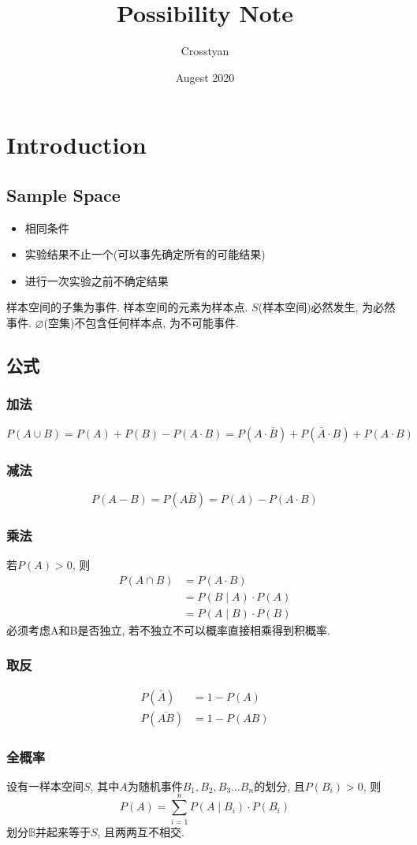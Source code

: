\documentclass[a4paper]{report}
\title{Possibility Note}
\author{Crosstyan}
\date{Augest 2020}
\begin{document}
\chapter{Introduction}
\section{Sample Space}
\begin{itemize}
  \item 相同条件
  \item 实验结果不止一个(可以事先确定所有的可能结果)
  \item 进行一次实验之前不确定结果
\end{itemize}
样本空间的子集为事件. 样本空间的元素为样本点. $S$(样本空间)必然发生, 为必然事件. $\varnothing$(空集)不包含任何样本点, 为不可能事件. 
\section{公式}
\subsection{加法}
$$P(A\cup B)=P(A)+P(B)-P(A\cdot B)=P(A\cdot\bar{B})+P(\bar{A}\cdot B)+P(A\cdot B)$$
\subsection{减法}
$$P(A-B)=P(A\bar{B})=P(A)-P(A\cdot B)$$
\subsection{乘法}
若$P(A) > 0$, 则
\begin{align*}
  P(A\cap B)&=P(A\cdot B)\\
  &=P(B\mid A) \cdot P(A)\\
  &=P(A\mid B)\cdot P(B)
\end{align*}
必须考虑A和B是否独立, 若不独立不可以概率直接相乘得到积概率. 
\subsection{取反}
\begin{align*}
  P(\bar{A})&=1-P(A)\\
  P(\overline{AB})&=1-P(AB)
\end{align*}
\subsection{全概率}
设有一样本空间$S$, 其中$A$为随机事件$B_1,B_2,B_3\dots B_n$的划分, 且$P(B_i)>0$, 则
$$P(A)=\sum_{i=1}^n P(A\mid B_i)\cdot P(B_i)$$
划分$\mathbb{B}$并起来等于$S$, 且两两互不相交. 
\end{document}
